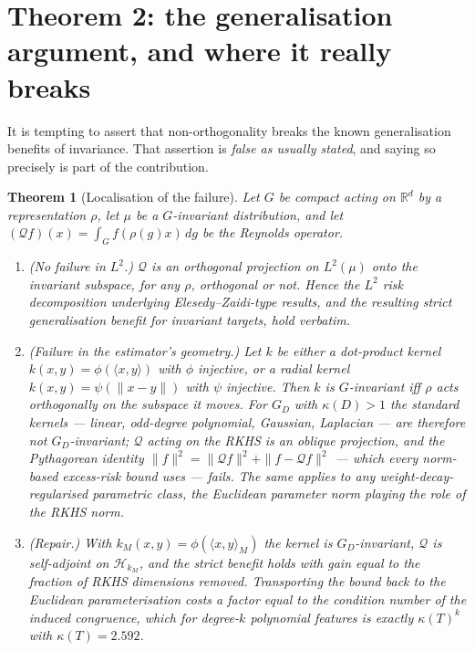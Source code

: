 \documentclass[11pt]{article}
\newtheorem{theorem}{Theorem}
\theoremstyle{definition}
\newcommand{\R}{\mathbb{R}}
\newcommand{\rhoext}{\rho}
\begin{document}
\section{Theorem 2: the generalisation argument, and where it really breaks}\label{sec:gen}

It is tempting to assert that non-orthogonality breaks the known generalisation
benefits of invariance. That assertion is \emph{false as usually stated}, and saying
so precisely is part of the contribution.

\begin{theorem}[Localisation of the failure]\label{thm:gen}
Let $G$ be compact acting on $\R^d$ by a representation $\rhoext$, let $\mu$ be a
$G$-invariant distribution, and let $(\mathcal{Q}f)(x) = \int_G f(\rhoext(g)x)\,dg$ be
the Reynolds operator.
\begin{enumerate}\itemsep1pt
\item[(a)] \emph{(No failure in $L^2$.)} $\mathcal{Q}$ is an \emph{orthogonal}
  projection on $L^2(\mu)$ onto the invariant subspace, for \emph{any} $\rhoext$,
  orthogonal or not. Hence the $L^2$ risk decomposition underlying
  Elesedy--Zaidi-type results, and the resulting strict generalisation benefit for
  invariant targets, hold verbatim.
\item[(b)] \emph{(Failure in the estimator's geometry.)} Let $k$ be either a
  dot-product kernel $k(x,y) = \phi(\langle x,y\rangle)$ with $\phi$ injective, or a
  radial kernel $k(x,y) = \psi(\|x-y\|)$ with $\psi$ injective. Then $k$ is
  $G$-invariant iff $\rhoext$ acts orthogonally on the subspace it moves. For $G_D$
  with $\kappa(D) > 1$ the standard kernels --- linear, odd-degree polynomial,
  Gaussian, Laplacian --- are therefore \emph{not} $G_D$-invariant; $\mathcal{Q}$
  acting on the RKHS is an \emph{oblique} projection, and the Pythagorean identity
  $\|f\|^2 = \|\mathcal{Q}f\|^2 + \|f - \mathcal{Q}f\|^2$ --- which every norm-based
  excess-risk bound uses --- fails. The same applies to any weight-decay-regularised
  parametric class, the Euclidean parameter norm playing the role of the RKHS norm.
\item[(c)] \emph{(Repair.)} With $k_M(x,y) = \phi(\langle x,y\rangle_{M})$ the kernel
  is $G_D$-invariant, $\mathcal{Q}$ is self-adjoint on $\mathcal{H}_{k_M}$, and the
  strict benefit holds with gain equal to the fraction of RKHS dimensions removed.
  Transporting the bound back to the Euclidean parameterisation costs a factor equal
  to the condition number of the induced congruence, which for degree-$k$ polynomial
  features is exactly $\kappa(T)^{k}$ with $\kappa(T) = 2.592$.
\end{enumerate}
\end{theorem}
\end{document}
